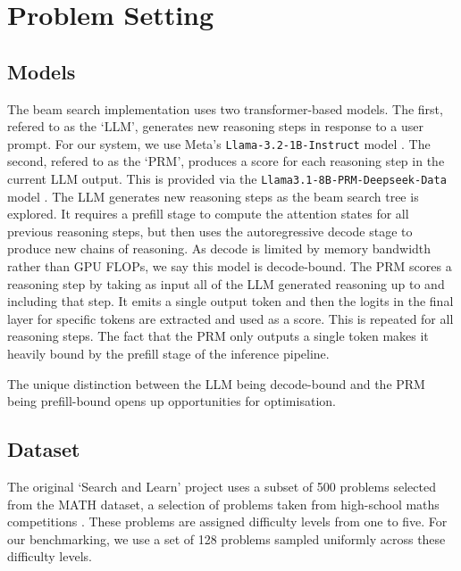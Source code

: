 \documentclass[11pt,twoside]{report}
\begin{document}
\section{Problem Setting}
\subsection{Models}
The beam search implementation uses two transformer-based models.
The first, refered to as the `LLM', generates new reasoning steps in response to a user prompt. 
For our system, we use Meta's \texttt{Llama-3.2-1B-Instruct} model \cite{grattafiori2024llama}.
The second, refered to as the `PRM', produces a score for each reasoning step in the current LLM output. 
This is provided via the \texttt{Llama3.1-8B-PRM-Deepseek-Data} model \cite{dong2024rlhf} \cite{ArmoRM} \cite{xiong2024iterative}.
The LLM generates new reasoning steps as the beam search tree is explored. 
It requires a prefill stage to compute the attention states for all previous reasoning steps, but then uses the autoregressive decode stage to produce new chains of reasoning. 
As decode is limited by memory bandwidth rather than GPU FLOPs, we say this model is decode-bound. %
The PRM scores a reasoning step by taking as input all of the LLM generated reasoning up to and including that step.
It emits a single output token and then the logits in the final layer for specific tokens are extracted and used as a score.
This is repeated for all reasoning steps.
The fact that the PRM only outputs a single token makes it heavily bound by the prefill stage of the inference pipeline.

The unique distinction between the LLM being decode-bound and the PRM being prefill-bound opens up opportunities for optimisation. %


\subsection{Dataset}
The original `Search and Learn' project uses a subset of 500 problems selected from the MATH dataset, a selection of problems taken from high-school maths competitions \cite{hendrycks2021measuring}.
These problems are assigned difficulty levels from one to five.
For our benchmarking, we use a set of 128 problems sampled uniformly across these difficulty levels.
\end{document}
